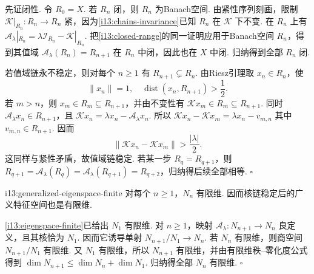 \begin{FAProof}
先证闭性. 令 \(\displaystyle R_0=X\). 若 \(\displaystyle R_n\) 闭，则 \(\displaystyle R_n\) 为Banach空间. 由紧性序列刻画，限制 \(\displaystyle \mathcal K|_{R_n}:R_n\to R_n\) 紧，因为\autoref{i13:chains-invariance}已知 \(\displaystyle R_n\) 在 \(\displaystyle \mathcal K\) 下不变. 在 \(\displaystyle R_n\) 上有
\(\displaystyle \mathcal A_\lambda|_{R_n} = \lambda\mathcal I_{R_n}-\mathcal K|_{R_n}\).
把\autoref{i13:closed-range}的同一证明应用于Banach空间 \(\displaystyle R_n\)，得到其值域 \(\displaystyle \mathcal A_\lambda(R_n)=R_{n+1}\) 在 \(\displaystyle R_n\) 中闭，因此也在 \(\displaystyle X\) 中闭. 归纳得到全部 \(\displaystyle R_n\) 闭.

若值域链永不稳定，则对每个 \(\displaystyle n\geqslant1\) 有 \(\displaystyle R_{n+1}\subsetneq R_n\). 由Riesz引理取 \(\displaystyle x_n\in R_n\)，使
\[
\|x_n\|=1,
\quad
\operatorname{dist}(x_n,R_{n+1})>\frac{1}{2}.
\]
若 \(\displaystyle m>n\)，则 \(\displaystyle x_m\in R_m\subseteq R_{n+1}\)，并由不变性有 \(\displaystyle \mathcal Kx_m\in R_m\subseteq R_{n+1}\). 同时 \(\displaystyle \mathcal A_\lambda x_n\in R_{n+1}\)，且
\(\displaystyle \mathcal Kx_n = \lambda x_n-\mathcal A_\lambda x_n\).
所以
\(\displaystyle \mathcal Kx_n-\mathcal Kx_m = \lambda x_n-v_{m,n}\)
其中 \(\displaystyle v_{m,n}\in R_{n+1}\). 因而
\[
\|\mathcal Kx_n-\mathcal Kx_m\|
>
\frac{|\lambda|}{2}.
\]
这同样与紧性矛盾，故值域链稳定. 若某一步 \(\displaystyle R_q=R_{q+1}\)，则 \(\displaystyle R_{q+1}=\mathcal A_\lambda(R_q)=\mathcal A_\lambda(R_{q+1})=R_{q+2}\)，归纳得后续全部相等.
\hfill\(\square\)
\end{FAProof}

\begin{FALemma}[B][广义特征空间有限维]{i13:generalized-eigenspace-finite}
对每个 \(\displaystyle n\geqslant1\)，\(\displaystyle N_n\) 有限维. 因而核链稳定后的广义特征空间也是有限维.
\end{FALemma}

\begin{FAProof}
\autoref{i13:eigenspace-finite}已给出 \(\displaystyle N_1\) 有限维. 对 \(\displaystyle n\geqslant1\)，映射
\(\displaystyle \mathcal A_\lambda:N_{n+1}\to N_n\)
良定义，且其核恰为 \(\displaystyle N_1\). 因而它诱导单射
\(\displaystyle N_{n+1}/N_1 \longrightarrow N_n\).
若 \(\displaystyle N_n\) 有限维，则商空间 \(\displaystyle N_{n+1}/N_1\) 有限维. 又 \(\displaystyle N_1\) 有限维，所以 \(\displaystyle N_{n+1}\) 有限维，并由有限维秩--零化度公式得到
\(\displaystyle \dim N_{n+1} \leqslant \dim N_n+ \dim N_1\).
归纳得全部 \(\displaystyle N_n\) 有限维.
\hfill\(\square\)
\end{FAProof}

